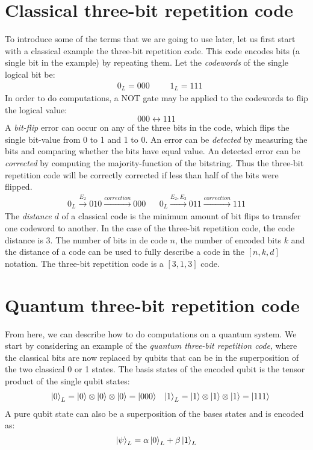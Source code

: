 \section{Classical three-bit repetition code}\label{sec:classical3bit}
To introduce some of the terms that we are going to use later, let us first start with a classical example the three-bit repetition code. This code encodes bits (a single bit in the example) by repeating them. Let the \emph{codewords} of the single logical bit be:
\begin{align}\label{eq:qb_3bitlogical}
    && 0_L = 000 &&& 1_L=111 &
\end{align}
In order to do computations, a NOT gate may be applied to the codewords to flip the logical value:
\begin{equation}
 000 \leftrightarrow 111
\end{equation}
A \emph{bit-flip} error can occur on any of the three bits in the code, which flips the single bit-value from 0 to 1 and 1 to 0. An error can be \emph{detected} by measuring the bits and comparing whether the bits have equal value. An detected error can be \emph{corrected} by computing the majority-function of the bitstring. Thus the three-bit repetition code will be correctly corrected if less than half of the bits were flipped.
\begin{align}
  0_L \xrightarrow{E_2} 010 \xrightarrow{correction} 000 && 0_L \xrightarrow{E_2, E_3} 011 \xrightarrow{correction} 111
\end{align}
The \emph{distance} $d$ of a classical code is the minimum amount of bit flips to transfer one codeword to another. In the case of the three-bit repetition code, the code distance is 3. The number of bits in de code $n$, the number of encoded bits $k$ and the distance of a code can be used to fully describe a code in the $[n, k, d]$ notation. The three-bit repetition code is a $[3,1,3]$ code.

\section{Quantum three-bit repetition code}\label{sec:quantum3bit}

From here, we can describe how to do computations on a quantum system. We start by considering an example of the \emph{quantum three-bit repetition code}, where the classical bits are now replaced by qubits that can be in the superposition of the two classical 0 or 1 states. The basis states of the encoded qubit is the tensor product of the single qubit states:
\begin{align}\label{eq:qb_3bitlogicalq}
&& \ket{0}_L = \ket{0}\otimes\ket{0}\otimes\ket{0} = \ket{000} && \ket{1}_L = \ket{1}\otimes\ket{1}\otimes\ket{1} = \ket{111}
\end{align}
A pure qubit state can also be a superposition of the bases states and is encoded as:
\begin{equation}\label{eq:qec_3bitstate}
  \ket{\psi}_L = \alpha\ket{0}_L + \beta\ket{1}_L
\end{equation}


